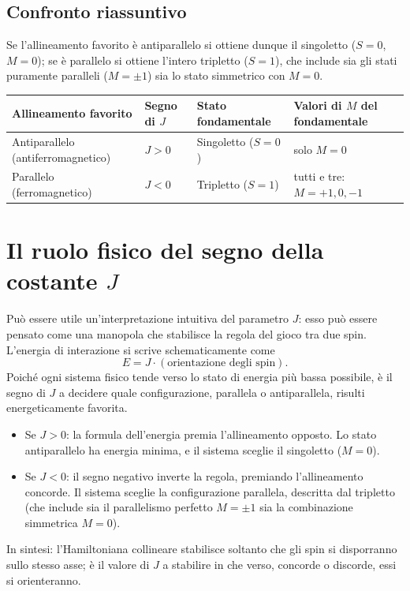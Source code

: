 \documentclass[11pt,a4paper]{article}
\begin{document}
\subsection{Confronto riassuntivo}

Se l'allineamento favorito \`e antiparallelo si ottiene dunque il singoletto ($S=0$,
$M=0$); se \`e parallelo si ottiene l'intero tripletto ($S=1$), che include sia gli
stati puramente paralleli ($M=\pm1$) sia lo stato simmetrico con $M=0$.

\begin{center}
\begin{tabular}{@{}p{3.6cm}p{2.2cm}p{3cm}p{4cm}@{}}
\toprule
Allineamento favorito & Segno di $J$ & Stato fondamentale & Valori di $M$ del fondamentale \\
\midrule
Antiparallelo (antiferromagnetico) & $J>0$ & Singoletto ($S=0$) & solo $M=0$ \\
Parallelo (ferromagnetico) & $J<0$ & Tripletto ($S=1$) & tutti e tre: $M=+1,0,-1$ \\
\bottomrule
\end{tabular}
\end{center}

\section{Il ruolo fisico del segno della costante $J$}

Pu\`o essere utile un'interpretazione intuitiva del parametro $J$: esso pu\`o essere
pensato come una manopola che stabilisce la regola del gioco tra due spin. L'energia di
interazione si scrive schematicamente come
$$E = J\cdot(\text{orientazione degli spin}).$$
Poich\'e ogni sistema fisico tende verso lo stato di energia pi\`u bassa possibile,
\`e il segno di $J$ a decidere quale configurazione, parallela o antiparallela,
risulti energeticamente favorita.
\begin{itemize}
\item Se $J>0$: la formula dell'energia premia l'allineamento opposto. Lo stato
antiparallelo ha energia minima, e il sistema sceglie il singoletto ($M=0$).
\item Se $J<0$: il segno negativo inverte la regola, premiando l'allineamento
concorde. Il sistema sceglie la configurazione parallela, descritta dal tripletto
(che include sia il parallelismo perfetto $M=\pm1$ sia la combinazione simmetrica
$M=0$).
\end{itemize}
In sintesi: l'Hamiltoniana collineare stabilisce soltanto che gli spin si disporranno
sullo stesso asse; \`e il valore di $J$ a stabilire in che verso, concorde o discorde,
essi si orienteranno.
\end{document}
